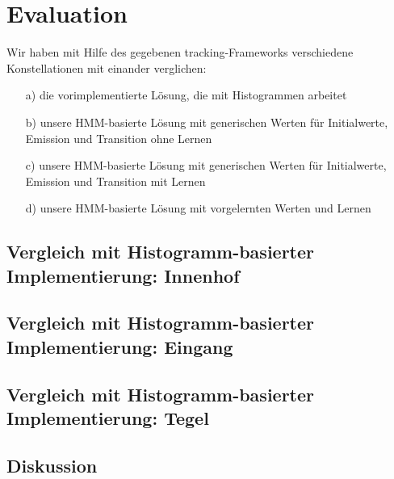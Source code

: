 \section{Evaluation}
\label{chap:evaluation}
Wir haben mit Hilfe des gegebenen tracking-Frameworks verschiedene Konstellationen mit einander verglichen:
\begin{itemize}
	\item[a)] die vorimplementierte Lösung, die mit Histogrammen arbeitet
	\item[b)] unsere HMM-basierte Lösung mit generischen Werten für Initialwerte, Emission und Transition ohne Lernen
	\item[c)] unsere HMM-basierte Lösung mit generischen Werten für Initialwerte, Emission und Transition mit Lernen
	\item[d)] unsere HMM-basierte Lösung mit vorgelernten Werten und Lernen
\end{itemize}
\subsection{Vergleich mit Histogramm-basierter Implementierung: Innenhof}
\label{sec:eval_innenhof}

\subsection{Vergleich mit Histogramm-basierter Implementierung: Eingang}
\label{sec:eval_eingang}

\subsection{Vergleich mit Histogramm-basierter Implementierung: Tegel}
\label{sec:eval:tegel}

\subsection{Diskussion}
\label{sec:diskussion}
 
